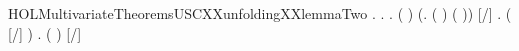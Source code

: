 \begin{SaveVerbatim}{HOLMultivariateTheoremsUSCXXunfoldingXXlemmaTwo}
\HOLTokenTurnstile{} \HOLSymConst{\HOLTokenForall{}}.
         \HOLSymConst{\HOLTokenImp{}}
       \HOLSymConst{\HOLTokenForall{}}.
              \HOLSymConst{\HOLTokenImp{}}
           \HOLSymConst{\HOLTokenForall{}}  .
               (  \HOLSymConst{=}  ) \HOLSymConst{\HOLTokenConj{}}   \HOLSymConst{\HOLTokenConj{}}
                (\HOLTokenLambda{}.  ( ) ( ))  \HOLSymConst{\HOLTokenConj{}}
               [/]  \HOLTokenTransBegin{}\HOLTokenTransEnd {} \HOLSymConst{\HOLTokenImp{}}
               \HOLSymConst{\HOLTokenExists{}}.
                      \HOLSymConst{\HOLTokenConj{}} ( \HOLSymConst{=} [/] ) \HOLSymConst{\HOLTokenConj{}}
                   \HOLSymConst{\HOLTokenForall{}}.
                       (  \HOLSymConst{=}  ) \HOLSymConst{\HOLTokenImp{}}
                       [/]  \HOLTokenTransBegin{} 
\end{SaveVerbatim}
\newcommand{\HOLMultivariateTheoremsUSCXXunfoldingXXlemmaTwo}{\UseVerbatim{HOLMultivariateTheoremsUSCXXunfoldingXXlemmaTwo}}

